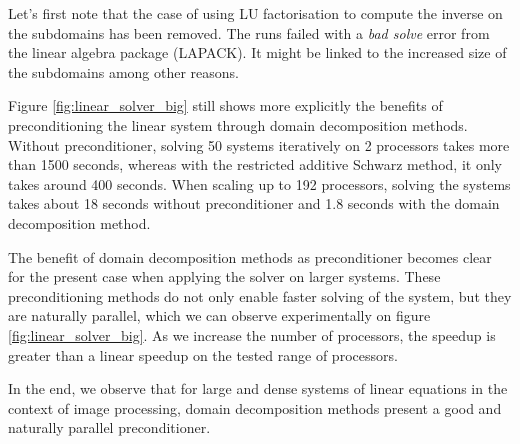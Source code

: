 Let's first note that the case of using LU factorisation to compute the inverse on the subdomains has been removed.
The runs failed with a \textit{bad solve} error from the linear algebra package (LAPACK).
It might be linked to the increased size of the subdomains among other reasons.

Figure \ref{fig:linear_solver_big} still shows more explicitly the benefits of preconditioning the linear system through domain decomposition methods.
Without preconditioner, solving 50 systems iteratively on 2 processors takes more than 1500 seconds, whereas with the restricted additive Schwarz method, it only takes around 400 seconds.
When scaling up to 192 processors, solving the systems takes about 18 seconds without preconditioner and 1.8 seconds with the domain decomposition method.

The benefit of domain decomposition methods as preconditioner becomes clear for the present case when applying the solver on larger systems.
These preconditioning methods do not only enable faster solving of the system, but they are naturally parallel, which we can observe experimentally on figure \ref{fig:linear_solver_big}.
As we increase the number of processors, the speedup is greater than a linear speedup on the tested range of processors.

In the end, we observe that for large and dense systems of linear equations in the context of image processing, domain decomposition methods present a good and naturally parallel preconditioner.
